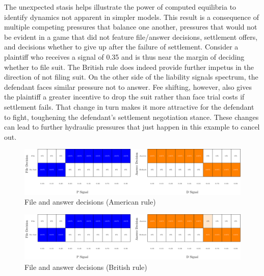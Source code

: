 \documentclass{article}
\begin{document}
The unexpected stasis helps illustrate the power of computed equilibria to identify dynamics not apparent in simpler models. This result is a consequence of multiple competing pressures that balance one another, pressures that would not be evident in a game that did not feature file/answer decisions, settlement offers, and decisions whether to give up after the failure of settlement. Consider a plaintiff who receives a signal of 0.35 and is thus near the margin of deciding whether to file suit. The British rule does indeed provide further impetus in the direction of not filing suit. On the other side of the liability signals spectrum, the defendant faces similar pressure not to answer. Fee shifting, however, also gives the plaintiff a greater incentive to drop the suit rather than face trial costs if settlement fails. That change in turn makes it more attractive for the defendant to fight, toughening the defendant's settlement negotiation stance. These changes can lead to further hydraulic pressures that just happen in this example to cancel out. 

\begin{figure}[h!]
\centering
\includegraphics[scale=0.50, trim={0in 0in 0in 0in}, clip]{../Figures/File and answer decisions (American).pdf}
\caption{File and answer decisions (American rule)}
\label{fig:fileans_american}
\end{figure}

\begin{figure}[h!]
\centering
\includegraphics[scale=0.50, trim={0in 0in 0in 0in}, clip]{../Figures/File and answer decisions (British).pdf}
\caption{File and answer decisions (British rule)}
\label{fig:fileans_british}
\end{figure}
\end{document}
